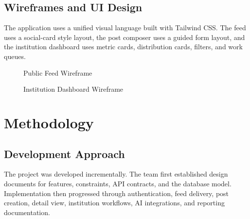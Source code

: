\documentclass[12pt,a4paper]{report}
\begin{document}
\section{Wireframes and UI Design}
The application uses a unified visual language built with Tailwind CSS. The feed uses a social-card style layout, the post composer uses a guided form layout, and the institution dashboard uses metric cards, distribution cards, filters, and work queues.

\begin{figure}[H]
\centering
{}
\caption{Public Feed Wireframe}
\end{figure}

\begin{figure}[H]
\centering
{}
\caption{Institution Dashboard Wireframe}
\end{figure}

\chapter{Methodology}
\section{Development Approach}
The project was developed incrementally. The team first established design documents for features, constraints, API contracts, and the database model. Implementation then progressed through authentication, feed delivery, post creation, detail view, institution workflows, AI integrations, and reporting documentation.
\end{document}
